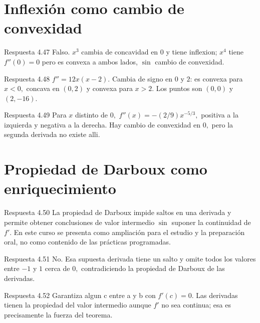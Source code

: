 \documentclass[10pt,a4paper,oneside,openany]{book}
\begin{document}
\section{Inflexión como cambio de convexidad}
\begin{PSevenAnswerFixed}{Respuesta 4.47}
Falso. \(x^{3}\) cambia de concavidad en \(0\) y tiene inflexion; \(x^{4}\) tiene \(f''(0)=0\) pero es convexa a ambos lados, \(\sin\) cambio de convexidad.
\end{PSevenAnswerFixed}
\begin{PSevenAnswerFixed}{Respuesta 4.48}
\(f''=12x(x-2)\). Cambia de signo en \(0\) y \(2\): es convexa para \(x<0,\) concava en \((0,2)\) y convexa para \(x>2\). Los puntos son \((0,0)\) y \((2,-16)\).
\end{PSevenAnswerFixed}
\begin{PSevenAnswerFixed}{Respuesta 4.49}
Para \(x\) distinto de \(0,\) \(f''(x)=-(2/9)x^{-5/3},\) positiva a la izquierda y negativa a la derecha. Hay cambio de convexidad en \(0,\) pero la segunda derivada no existe alli.
\end{PSevenAnswerFixed}
\section{Propiedad de Darboux como enriquecimiento}
\begin{PSevenAnswerFixed}{Respuesta 4.50}
La propiedad de Darboux impide saltos en una derivada y permite obtener conclusiones de valor intermedio \(\sin\) suponer la continuidad de \(f'\). En este curso se presenta como ampliación para el estudio y la preparación oral, no como contenido de las prácticas programadas.
\end{PSevenAnswerFixed}
\begin{PSevenAnswerFixed}{Respuesta 4.51}
No. Esa supuesta derivada tiene un salto y omite todos los valores entre \(-1\) y \(1\) cerca de \(0,\) contradiciendo la propiedad de Darboux de las derivadas.
\end{PSevenAnswerFixed}
\begin{PSevenAnswerFixed}{Respuesta 4.52}
Garantiza algun c entre a y b con \(f'(c)=0\). Las derivadas tienen la propiedad del valor intermedio aunque \(f'\) no sea continua; esa es precisamente la fuerza del teorema.
\end{PSevenAnswerFixed}
\end{document}
